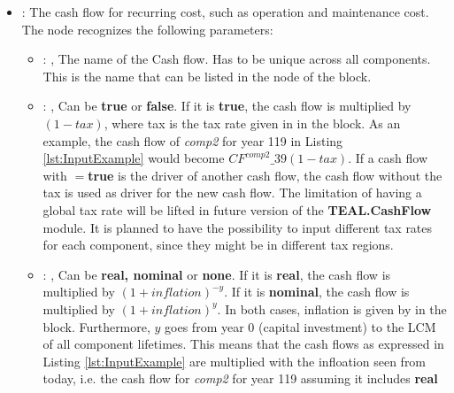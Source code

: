 \begin{itemize}
    \item {}:
      The cash flow for recurring cost, such as operation and maintenance cost.
      The  node recognizes the following parameters:
        \begin{itemize}
          \item {}: , 
            The name of the Cash flow. Has to be unique across all components. This is the name that
            can be listed in the                              node of the
             block.
          \item {}: , 
            Can be \textbf{true} or \textbf{false}. If it is \textbf{true}, the cash flow is
            multiplied by $(1-tax)$, where tax                                 is the tax rate given
            in  in the                                  block. As an
            example, the cash flow of \textit{comp2} for year 119 in Listing \ref{lst:InputExample}
            would become $CF^{comp2}\_{39}(1-tax)$.                                 If a cash flow
            with $=$\textbf{true} is the driver of another cash flow, the cash flow
            without the tax is used as driver for the new cash flow.
            The limitation of having a global tax rate will be lifted in future version of the
            \textbf{TEAL.CashFlow} module. It is planned to have the possibility to
            input different tax rates for each component, since they might be in different tax
            regions.
          \item {}: , 
            Can be \textbf{real, nominal} or \textbf{none}. If it is \textbf{real}, the cash flow is
            multiplied by                               $(1+inflation)^{-y}$. If it is
            \textbf{nominal}, the cash flow is multiplied by $(1+inflation)^y$.
            In both cases, inflation is given by  in the  block.
            Furthermore, $y$ goes from year 0 (capital investment)                               to
            the LCM of all component lifetimes.                               This means that the
            cash flows as expressed in Listing \ref{lst:InputExample} are multiplied with the
            infloation seen from today, i.e. the cash                               flow for
            \textit{comp2} for year 119 assuming it includes \textbf{real}

\end{itemize}
\end{itemize}
